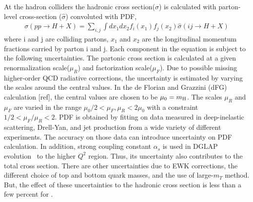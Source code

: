 At the hadron colliders the hadronic cross section($\sigma$) is calculated with 
parton-level cross-section ($\hat{\sigma}$) convoluted with PDF, 
\begin{eqnarray} 
\sigma (pp \rightarrow H+X) 
= 
\sum_{i,j} \int dx_1 dx_2 f_i(x_1) f_j(x_2) 
\hat{\sigma} \left( ij \rightarrow H+X \right)
\end{eqnarray} 
where i and j are colliding partons, 
$x_1$ and $x_2$ are the longitudinal momentum fractions carried by parton i and j. 
Each component in the equation is subject to the following uncertainties.
The partonic cross section is calculated at a given
renormalization scale($\mu_R$) and factorization scale($\mu_F$). 
Due to possible missing higher-order QCD radiative corrections,
the uncertainty is estimated by varying the scales around 
the central values. In the de Florian and Grazzini (dFG) 
calculation [ref], the central values are chosen to be $\mu_0 = m_{\mathrm{H}}$. 
The scales $\mu_R$ and $\mu_F$ are varied in the range 
$\mu_0/2 < \mu_F, \mu_R < 2\mu_0$ 
with a constraint $1/2 < \mu_F/\mu_R < 2$. 
PDF is obtained by fitting on data measured in deep-inelastic scattering, 
Drell-Yan, and jet production from a wide variety of different experiments. 
The accuracy on those data can introduce uncertainty on PDF calculation. 
In addition, strong coupling constant $\alpha_s$ is used in DGLAP 
evolution~\cite{Altarelli:1977zs,Dokshitzer:1977sg,Gribov:1972ri} 
to the higher $Q^2$ region. Thus, its uncertainty also contributes to 
the total cross section. There are other uncertainties due to 
EWK corrections, the different choice of top and bottom quark masses, 
and the use of large-$m_T$ method. But, the effect of these uncertainties to the 
hadronic cross section is less than a few percent \cite{Dittmaier:2012vm}
for \ggH.

